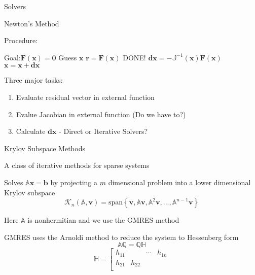 \documentclass{beamer}
\begin{document}
\begin{section}{Solvers}
\begin{frame}{Newton's Method}
\begin{block}{Procedure:}
\begin{algorithmic}[1]
  \color{blue}
  \STATE Goal:$\mathbf{F}\left(\mathbf{x}\right) = \mathbf{0}$
  \color{black}
  \STATE Guess $\mathbf{x}$
    \STATE $\mathbf{r} = \mathbf{F}\left(\mathbf{x}\right)$
     \STATE DONE! \ENDIF
    \STATE $\mathbf{dx} = -\mathbb{J}^{-1}\left(\mathbf{x}\right)\mathbf{F}\left(\mathbf{x}\right)$
    \STATE $\mathbf{x} = \mathbf{x} + \mathbf{dx}$
  \ENDFOR
\end{algorithmic}
\end{block}
Three major tasks:
\begin{enumerate}
  \item Evaluate residual vector in external function
  \item Evalue Jacobian in external function (Do we have to?)
  \item Calculate $\mathbf{dx}$ - Direct or Iterative Solvers?
\end{enumerate}
\end{frame}
\begin{frame}{Krylov Subspace Methods}
\begin{customlist}{2ex}{0pt}
  \item A class of iterative methods for sparse systems
  \item Solves $\mathbb{A}\mathbf{x}=\mathbf{b}$ by projecting a $m$ dimensional problem into a lower dimensional Krylov subspace
  \[
   \mathcal{K}_{n}\left(\mathbb{A},\mathbf{v}\right)=\mathrm{span}\left\{ \mathbf{v},\mathbb{A}\mathbf{v},\mathbb{A}^{2}\mathbf{v},...,\mathbb{A}^{n-1}\mathbf{v}\right\} 
  \]
  \item Here $\mathbb{A}$ is nonhermitian and we use the GMRES method
  \item GMRES uses the Arnoldi method to reduce the system to Hessenberg form
  \[
   \mathbb{A}\mathbb{Q}=\mathbb{Q}\mathbb{H}
  \]
  \[
   \mathbb{H}=\left[\begin{array}{cccc}
    h_{11} &  & \cdots & h_{1n}\\
    h_{21} & h_{22}\\

\end{array}\]
\end{customlist}
\end{frame}
\end{section}
\end{document}
